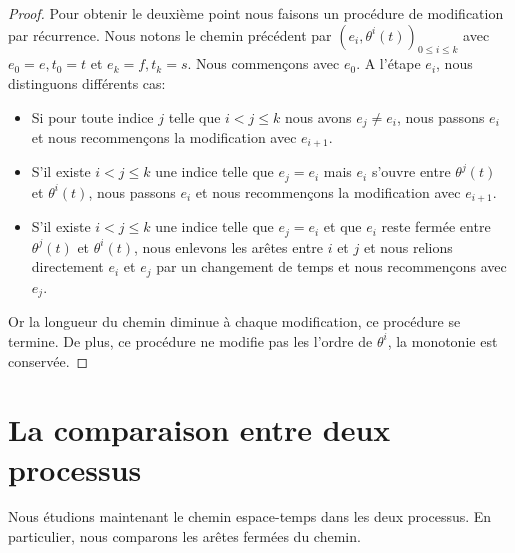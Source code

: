 \documentclass[titlepage,a4paper,12pt]{article}
\begin{document}
\begin{proof}
Pour obtenir le deuxième point nous faisons un procédure de modification par récurrence. Nous notons le chemin précédent par $(e_i,\theta^i(t))_{0\leqslant i \leqslant k}$ avec $e_0 = e,t_0 = t$ et $e_k=f, t_k = s$. Nous commençons avec $e_0$. A l'étape $e_i$, nous distinguons différents cas: 
\begin{itemize}[leftmargin = 0.4cm]
\item Si pour toute indice $j$ telle que $i<j\leqslant k$ nous avons $e_j\neq e_i$, nous passons $e_i$ et nous recommençons la modification avec $e_{i+1}$.
\item S'il existe $i<j\leqslant k$ une indice telle que $e_j=e_i$ mais $e_i$ s'ouvre entre $\theta^j(t)$ et $\theta^i(t)$, nous passons $e_i$ et nous recommençons la modification avec $e_{i+1}$.
\item S'il existe $i<j\leqslant k$ une indice telle que $e_j=e_i$ et que $e_i$ reste fermée entre $\theta^j(t)$ et $\theta^i(t)$, nous enlevons les arêtes entre $i$ et $j$ et nous relions directement $e_i$ et $e_j$ par un changement de temps et nous recommençons avec $e_j$. 
\end{itemize}
Or la longueur du chemin diminue à chaque modification, ce procédure se termine. De plus, ce procédure ne modifie pas les l'ordre de $\theta^i$, la monotonie est conservée.
\end{proof}

\section{La comparaison entre deux processus}
Nous étudions maintenant le chemin espace-temps dans les deux processus. En particulier, nous comparons les arêtes fermées du chemin.
\end{document}
